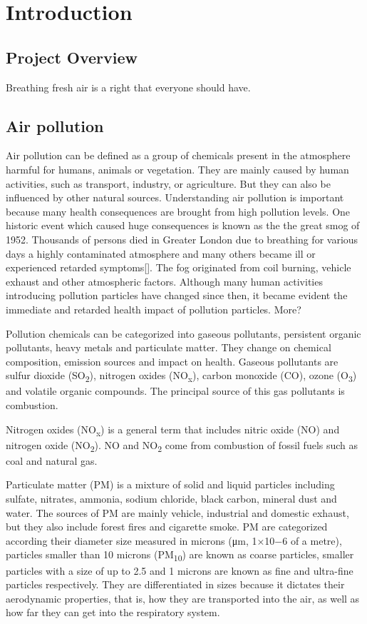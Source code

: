 \chapter{Introduction}

\section{Project Overview}
Breathing fresh air is a right that everyone should have.

\section{Air pollution}
Air pollution can be defined as a group of chemicals present in the atmosphere harmful for humans, animals or vegetation. They are mainly caused by human activities, such as transport, industry, or agriculture. But they can also be influenced by other natural sources. Understanding air pollution is important because many health consequences are brought from high pollution levels. One historic event which caused huge consequences is known as the the great smog of 1952. Thousands of persons died in Greater London due to  breathing for various days a highly contaminated atmosphere and many others became ill or experienced retarded symptoms[]. The fog originated from coil burning, vehicle exhaust and other atmospheric factors. Although many human activities introducing pollution particles have changed since then, it became evident the immediate and retarded health impact of pollution particles. More?

Pollution chemicals can be categorized into gaseous pollutants, persistent organic pollutants, heavy metals and particulate matter. They change on chemical composition, emission sources and impact on health. Gaseous pollutants are sulfur dioxide (SO\textsubscript{2}), nitrogen oxides (NO\textsubscript{x}), carbon monoxide (CO), ozone (O\textsubscript{3}) and volatile organic compounds. The principal source of this gas pollutants is combustion. 

Nitrogen oxides (NO\textsubscript{x}) is a general term that includes nitric oxide (NO) and nitrogen oxide (NO\textsubscript{2}). NO and NO\textsubscript{2} come from combustion of fossil fuels such as coal and natural gas.

Particulate matter (PM) is a mixture of solid and liquid particles including sulfate, nitrates, ammonia, sodium chloride, black carbon, mineral dust and water. The sources of PM are mainly vehicle, industrial and domestic exhaust, but they also include forest fires and cigarette smoke. PM are categorized according their diameter size measured in microns (μm, 1×10−6 of a metre), particles smaller than 10 microns (PM\textsubscript{10}) are known as coarse particles, smaller particles with a size of up to 2.5  and 1 microns are known as fine and ultra-fine particles respectively. They are differentiated in sizes because it dictates their aerodynamic properties, that is, how they are transported into the air, as well as how far they can get into the respiratory system.


